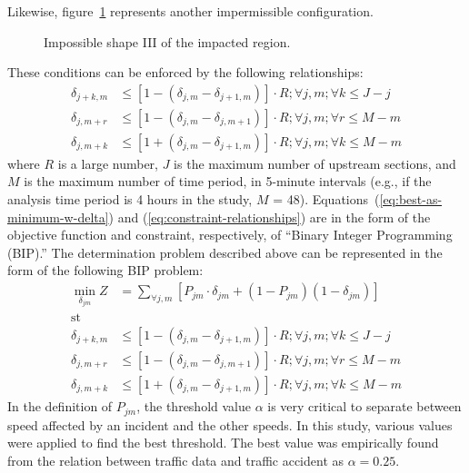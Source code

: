 \documentclass[12pt]{report}
\newcommand{\inputTikZ}[1]{%
  }
\newcommand{\inputTikZ}[1]{%
    \beginpgfgraphicnamed{#1-external}%
    \endpgfgraphicnamed%
  }
\begin{document}
Likewise, figure~\ref{fig:time-space-incident-schematic-infeasible-3}
represents another impermissible configuration.
\begin{figure}[t]
  \begin{center}
    \inputTikZ{figs/time-space-incident-schematic-infeasible-3}
    \caption[Impossible shape III of the impacted region]{Impossible shape III of the impacted region.}
    \label{fig:time-space-incident-schematic-infeasible-3}
  \end{center}
\end{figure}
These conditions can be enforced by the following relationships:
\begin{subequations}
  \label{eq:constraint-relationships}
  \begin{align}
    \label{eq:constraint-relationship-a}
    \delta_{j+k,m} &\le \left[1 - (\delta_{j,m} - \delta_{j+1,m})\right]\cdot{}R; \forall{}j, m; \forall{}k \le J - j\\
    \label{eq:constraint-relationship-b}        
    \delta_{j,m+r} & \le \left[1 - (\delta_{j,m} - \delta_{j,m+1})\right]\cdot{}R; \forall{}j, m; \forall{}r \le M - m\\
    \label{eq:constraint-relationship-c}            
    \delta_{j,m+k} & \le \left[1 + (\delta_{j,m} - \delta_{j+1,m})\right]\cdot{}R; \forall{}j, m; \forall{}k \le M - m
  \end{align}
\end{subequations}
where $R$ is a large number, $J$ is the maximum number of upstream
sections, and $M$ is the maximum number of time period, in 5-minute
intervals (e.g., if the analysis time period is 4 hours in the study,
$M$ = 48).  Equations~(\ref{eq:best-as-minimum-w-delta}) and
(\ref{eq:constraint-relationships}) are in the form of the objective
function and constraint, respectively, of ``Binary Integer Programming
(BIP).'' The determination problem described above can be represented
in the form of the following BIP problem:
\begin{equation}
  \begin{split}
  \label{eq:bip-formulation}
  \min\limits_{\delta_{jm}} Z & = \sum\limits_{\forall{}j,m}\left[P_{jm}\cdot{}\delta_{jm}+(1-P_{jm})(1-\delta_{jm})\right] \\
  \textrm{st}~~~~~~~~~&\\
    \delta_{j+k,m} &\le \left[1 - (\delta_{j,m} - \delta_{j+1,m})\right]\cdot{}R; \forall{}j, m; \forall{}k \le J - j\\
    \delta_{j,m+r} & \le \left[1 - (\delta_{j,m} - \delta_{j,m+1})\right]\cdot{}R; \forall{}j, m; \forall{}r \le M - m\\
    \delta_{j,m+k} & \le \left[1 + (\delta_{j,m} - \delta_{j+1,m})\right]\cdot{}R; \forall{}j, m; \forall{}k \le M - m
  \end{split}
\end{equation}
In the definition of $P_{jm}$, the threshold value $\alpha$ is very
critical to separate between speed affected by an incident and the
other speeds.  In this study, various values were applied to find the
best threshold. The best value was empirically found from the relation
between traffic data and traffic accident as $\alpha = 0.25$.
\end{document}
